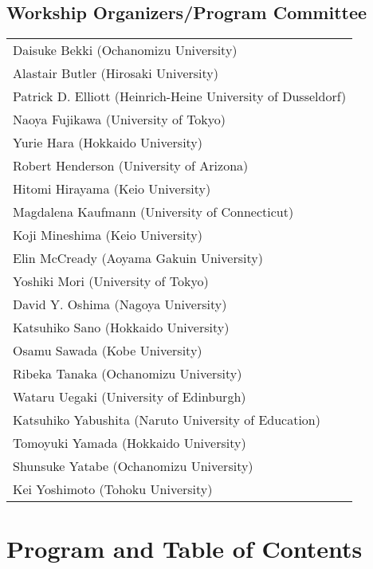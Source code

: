 \documentclass[12pt]{jarticle}
\begin{document}
\subsection*{Workship Organizers/Program Committee}
\begin{flushleft}
\begin{tabular}{l}
Daisuke Bekki (Ochanomizu University) \\
Alastair Butler (Hirosaki University) \\
Patrick D. Elliott (Heinrich-Heine University of Dusseldorf) \\
Naoya Fujikawa (University of Tokyo) \\
Yurie Hara (Hokkaido University) \\
Robert Henderson (University of Arizona) \\
Hitomi Hirayama (Keio University) \\
Magdalena Kaufmann (University of Connecticut) \\
Koji Mineshima (Keio University) \\
Elin McCready (Aoyama Gakuin University) \\
Yoshiki Mori (University of Tokyo) \\
David Y. Oshima (Nagoya University) \\
Katsuhiko Sano (Hokkaido University) \\
Osamu Sawada (Kobe University) \\
Ribeka Tanaka (Ochanomizu University) \\
Wataru Uegaki (University of Edinburgh) \\
Katsuhiko Yabushita (Naruto University of Education) \\
Tomoyuki Yamada (Hokkaido University) \\
Shunsuke Yatabe (Ochanomizu University) \\
Kei Yoshimoto (Tohoku University) \\

\end{tabular}
\end{flushleft}
\newpage
  
\section*{Program and Table of Contents}

\newcommand{\slot}[2]{\noindent \underline{#1 \  #2} \\}
\newcommand{\talk}[3]{
  \noindent #2 \\ 
  \indent\indent \textit{#1} \dotfill #3 
  \smallskip \\
  }
\newcommand{\talkk}[3]{
  \noindent #2 \\ 
  \indent\indent \textit{#1}
  \smallskip \\
  }
\end{document}
